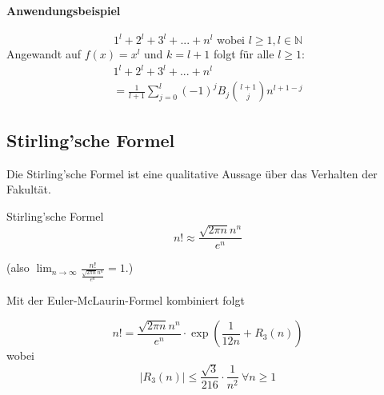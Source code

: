 \documentclass[a4paper,10pt]{article}
\def\limn{\lim_{n\to \infty}}
\def\dx{\text{ d}x}
\begin{document}
\paragraph{Anwendungsbeispiel}
$$1^l + 2^l + 3^l + ... + n^l \text{ wobei } l \geq 1, l \in \mathbb{N}$$
Angewandt auf $f(x) = x^l$ und $k = l + 1$ folgt für alle $l \geq 1$:
\begin{multline*}
1^l + 2^l + 3^l + ... + n^l \\
= \frac{1}{l + 1} \sum_{j = 0}^l (-1)^j B_j {l + 1 \choose j} n^{l+1-j}
\end{multline*}


\subsection{Stirling'sche Formel}
Die Stirling'sche Formel ist eine qualitative Aussage über das Verhalten der Fakultät.
\begin{subbox}{Stirling'sche Formel}
\[ n! \approx \frac{\sqrt{2 \pi n} n^n}{e^n} \]
\end{subbox}
(also $\limn{\frac{n!}{\frac{\sqrt{2 \pi n} n^n}{e^n}}} = 1$.)

Mit der Euler-McLaurin-Formel kombiniert folgt
\begin{subbox}{}
$$n! = \frac{\sqrt{2\pi n} n^n}{e^n} \cdot \exp \left( \frac{1}{12n}+R_3(n) \right)$$
wobei
\[ |R_3(n)| \le \frac{\sqrt{3}}{216}\cdot\frac{1}{n^2} \ \forall n \ge 1 \]
\end{subbox}
\end{document}
